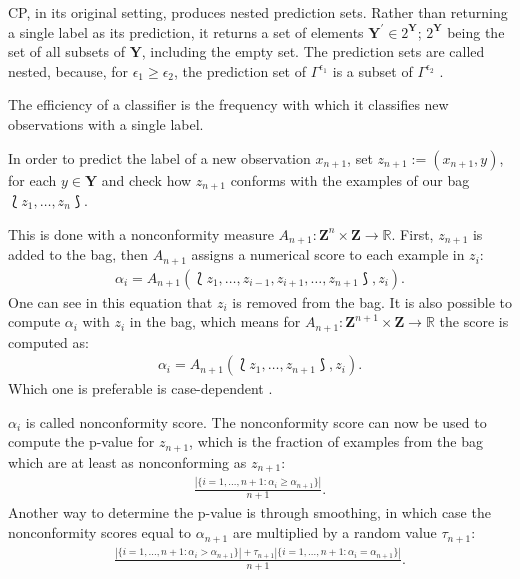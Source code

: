 \documentclass[twoside,11pt]{article}
\begin{document}
CP, in its original setting, produces nested prediction
sets. Rather than returning a single label as its
prediction, it returns a set of elements
$\textbf{Y}^\prime \in 2^{\textbf{Y}}$; $2^{\textbf{Y}}$
being the set of all subsets of $\textbf{Y}$, including the
empty set.
The prediction sets are called nested, because, for
$\epsilon_1 \geq \epsilon_2$, the prediction set of
$\Gamma^{\epsilon_1}$ is a subset of $\Gamma^{\epsilon_2}$
\citep[see][Chapter 2]{alrw}.

The efficiency of a classifier is the frequency with which
it classifies new observations with a single label.

In order to predict the label of a new observation
$x_{n+1}$, set $z_{n+1}:=(x_{n+1}, y)$, for each
$y \in \textbf{Y}$ and check how $z_{n+1}$ conforms with
the examples of our bag $\Lbag z_1,\dots,z_n \Rbag$.

This is done with a nonconformity measure
$A_{n+1}:\textbf{Z}^n \times \textbf{Z} \rightarrow
\mathbb{R}$. First, $z_{n+1}$ is added to the bag, then
$A_{n+1}$ assigns a numerical score to each example in
$z_i$:
\begin{align}
  \alpha_i = A_{n+1}(\Lbag z_1,\dots,z_{i-1},z_{i+1},
             \dots,z_{n+1} \Rbag, z_i).
\label{eq:a0}
\end{align}
One can see in this equation that $z_i$ is removed from the
bag. It is also possible to compute $\alpha_i$ with $z_i$
in the bag, which means for
$A_{n+1}:\textbf{Z}^{n+1} \times \textbf{Z} \rightarrow
\mathbb{R}$ the score is computed as:
\begin{align}
  \alpha_i = A_{n+1}(\Lbag z_1,\dots,z_{n+1} \Rbag, z_i).
\label{eq:a1}
\end{align}
Which one is preferable is case-dependent
\citep[see][Chapter 4.2.2]{shafer_et_al_2008}.

$\alpha_i$ is called nonconformity score.
The nonconformity score can now be used to compute the
p-value for $z_{n+1}$, which is the fraction of examples
from the bag which are at least as nonconforming as
$z_{n+1}$:
\begin{align}
  \frac{|\{i=1,\dots,n+1: \alpha_i \geq \alpha_{n+1}\}|}
       {n + 1}.
\label{eq:p0}
\end{align}
Another way to determine the p-value is through smoothing,
in which case the nonconformity scores equal to
$\alpha_{n+1}$ are multiplied by a random value
$\tau_{n+1}$:
\begin{align}
  \frac{|\{i=1,\dots,n+1: \alpha_i > \alpha_{n+1}\}|
    + \tau_{n+1} |\{i=1,\dots,n+1:\alpha_i=\alpha_{n+1}\}|}
       {n + 1}.
\label{eq:p1}
\end{align}
\end{document}
